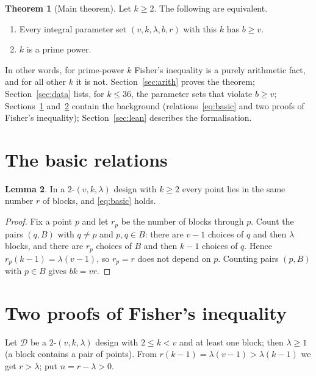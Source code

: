 \documentclass[11pt,a4paper]{article}
\theoremstyle{definition}
\newtheorem{theorem}{Theorem}[section]
\newtheorem{lemma}[theorem]{Lemma}
\begin{document}
\begin{theorem}[Main theorem]\label{thm:main}
  Let $k\ge2$. The following are equivalent.
  \begin{enumerate}
    \item[(a)] Every integral parameter set $(v,k,\lambda,b,r)$ with this $k$ has $b\ge v$.
    \item[(b)] $k$ is a prime power.
  \end{enumerate}
\end{theorem}
In other words, for prime-power $k$ Fisher's inequality is a purely arithmetic fact, and for all other $k$ it is not.
Section~\ref{sec:arith} proves the theorem; Section~\ref{sec:data} lists, for $k\le36$, the parameter sets that violate $b\ge v$; Sections~\ref{sec:basic} and~\ref{sec:fisher} contain the background (relations~\eqref{eq:basic} and two proofs of Fisher's inequality); Section~\ref{sec:lean} describes the formalisation.

\section{The basic relations}\label{sec:basic}
\begin{lemma}\label{lem:basic}
  In a $2$-$(v,k,\lambda)$ design with $k\ge2$ every point lies in the same number $r$ of blocks, and \eqref{eq:basic} holds.
\end{lemma}
\begin{proof}
  Fix a point $p$ and let $r_p$ be the number of blocks through $p$.
  Count the pairs $(q,B)$ with $q\ne p$ and $p,q\in B$: there are $v-1$ choices of $q$ and then $\lambda$ blocks, and there are $r_p$ choices of $B$ and then $k-1$ choices of $q$.
  Hence $r_p(k-1)=\lambda(v-1)$, so $r_p=r$ does not depend on $p$.
  Counting pairs $(p,B)$ with $p\in B$ gives $bk=vr$.
\end{proof}

\section{Two proofs of Fisher's inequality}\label{sec:fisher}
Let $\mathcal D$ be a $2$-$(v,k,\lambda)$ design with $2\le k<v$ and at least one block; then $\lambda\ge1$ (a block contains a pair of points).
From $r(k-1)=\lambda(v-1)>\lambda(k-1)$ we get $r>\lambda$; put $n=r-\lambda>0$.
\end{document}
